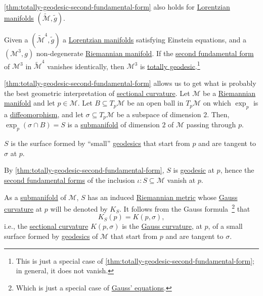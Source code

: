 \begin{note}
	\autoref{thm:totally-geodesic-second-fundamental-form} also holds for \hyperref[def:Lorentzian]{Lorentzian manifolds} \((\widetilde{\mathcal{M}} , \widetilde{g} )\).
\end{note}

\begin{eg}
	Given a \((\widetilde{\mathcal{M}} ^4, \widetilde{g} )\) a \hyperref[def:Lorentzian]{Lorentzian manifolds} satisfying Einstein equations, and a \((\mathcal{M} ^3, g)\) non-degenerate \hyperref[def:Riemannian-manifold]{Riemannian manifold}. If the \hyperref[def:2nd-fundamental-form]{second fundamental form} of \(\mathcal{M} ^3\) in \(\widetilde{\mathcal{M}} ^4\) vanishes identically, then \(\mathcal{M} ^3\) is \hyperref[def:totally-geodesic]{totally geodesic}.\footnote{This is just a special case of \autoref{thm:totally-geodesic-second-fundamental-form}; in general, it does not vanish.}
\end{eg}

\autoref{thm:totally-geodesic-second-fundamental-form} allows us to get what is probably the best geometric interpretation of \hyperref[def:sectional-curvature]{sectional curvature}. Let \(\mathcal{M} \) be a \hyperref[def:Riemannian-manifold]{Riemannian manifold} and let \(p\in \mathcal{M} \). Let \(B \subseteq T_p \mathcal{M} \) be an open ball in \(T_p \mathcal{M} \) on which \(\exp_p\) is a \hyperref[def:diffeomorphism]{diffeomorphism}, and let \(\sigma \subseteq T_p \mathcal{M} \) be a subspace of dimension \(2\). Then, \(\exp_p(\sigma \cap B) = S\) is a \hyperref[def:submanifold]{submanifold} of dimension \(2\) of \(\mathcal{M} \) passing through \(p\).

\begin{intuition}
	\(S\) is the surface formed by ``small'' \hyperref[def:geodesic]{geodesics} that start from \(p\) and are tangent to \(\sigma \) at \(p\).
\end{intuition}

\begin{note}
	By \autoref{thm:totally-geodesic-second-fundamental-form}, \(S\) is \hyperref[def:geodesic]{geodesic} at \(p\), hence the \hyperref[def:2nd-fundamental-form]{second fundamental forms} of the inclusion \(\iota \colon S \subseteq \mathcal{M} \) vanish at \(p\).
\end{note}

As a \hyperref[def:submanifold]{submanifold} of \(\mathcal{M} \), \(S\) has an induced \hyperref[def:Riemannian-metric]{Riemannian metric} whose \hyperref[rmk:Gauss-curvature]{Gauss curvature} at \(p\) will be denoted by \(K_S\). It follows from the Gauss formula~\cite[ Theorem 2.5]{flaherty2013riemannian}\footnote{Which is just a special case of \hyperref[thm:Gauss-equations]{Gauss' equations}.} that
\[
	K_S(p) = K(p, \sigma ),
\]
i.e., the \hyperref[def:sectional-curvature]{sectional curvature} \(K(p, \sigma )\) is the \hyperref[rmk:Gauss-curvature]{Gauss curvature}, at \(p\), of a small surface formed by \hyperref[def:geodesic]{geodesics} of \(\mathcal{M} \) that start from \(p\) and are tangent to \(\sigma \).

